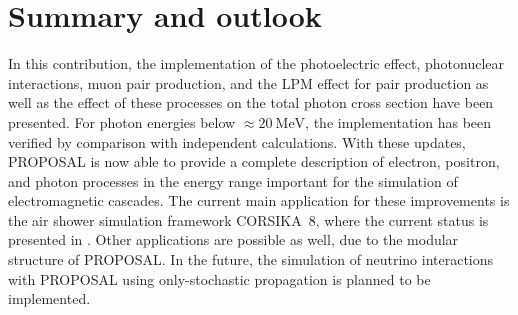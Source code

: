 \section{Summary and outlook}

In this contribution, the implementation of the photoelectric effect, photonuclear interactions, muon pair production, and the LPM effect for pair production as well as the effect of these processes on the total photon cross section have been presented.
For photon energies below $\approx \SI{20}{\mega\electronvolt}$, the implementation has been verified by comparison with independent calculations. 
With these updates, PROPOSAL is now able to provide a complete description of electron, positron, and photon processes in the energy range important for the simulation of electromagnetic cascades.
The current main application for these improvements is the air shower simulation framework CORSIKA~8, where the current status is presented in \cite{icrc2023}.
Other applications are possible as well, due to the modular structure of PROPOSAL.
In the future, the simulation of neutrino interactions with PROPOSAL using only-stochastic propagation is planned to be implemented.